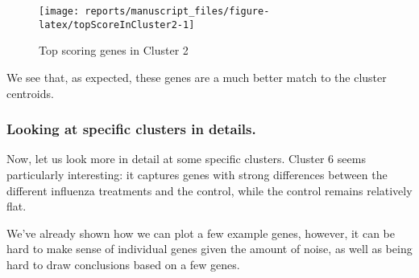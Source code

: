 \documentclass[9pt,a4paper,]{extarticle}
\newenvironment{Shaded}{\begin{snugshade}}{\end{snugshade}}
\newcommand{\CommentTok}[1]{\textcolor[rgb]{0.56,0.35,0.01}{\textit{#1}}}
\newcommand{\DataTypeTok}[1]{\textcolor[rgb]{0.13,0.29,0.53}{#1}}
\newcommand{\DecValTok}[1]{\textcolor[rgb]{0.00,0.00,0.81}{#1}}
\newcommand{\FloatTok}[1]{\textcolor[rgb]{0.00,0.00,0.81}{#1}}
\newcommand{\KeywordTok}[1]{\textcolor[rgb]{0.13,0.29,0.53}{\textbf{#1}}}
\newcommand{\NormalTok}[1]{#1}
\newcommand{\OperatorTok}[1]{\textcolor[rgb]{0.81,0.36,0.00}{\textbf{#1}}}
\newcommand{\OtherTok}[1]{\textcolor[rgb]{0.56,0.35,0.01}{#1}}
\newcommand{\StringTok}[1]{\textcolor[rgb]{0.31,0.60,0.02}{#1}}
\begin{document}
\begin{Shaded}
\end{Shaded}

\begin{figure}[H]

{\centering \texttt{[image: reports/manuscript\_files/figure-latex/topScoreInCluster2-1]} 

}

\caption{Top scoring genes in Cluster 2}\label{fig:topScoreInCluster2}
\end{figure}

We see that, as expected, these genes are a much better match to the cluster centroids.

\hypertarget{looking-at-specific-clusters-in-details.}{%
\subsubsection{Looking at specific clusters in details.}\label{looking-at-specific-clusters-in-details.}}

Now, let us look more in detail at some specific clusters. Cluster 6 seems
particularly interesting: it captures genes with strong differences between
the different influenza treatments and the control, while the control remains
relatively flat.

We've already shown how we can plot a few example genes, however, it can be
hard to make sense of individual genes given the amount of noise, as well as
being hard to draw conclusions based on a few genes.
\end{document}
